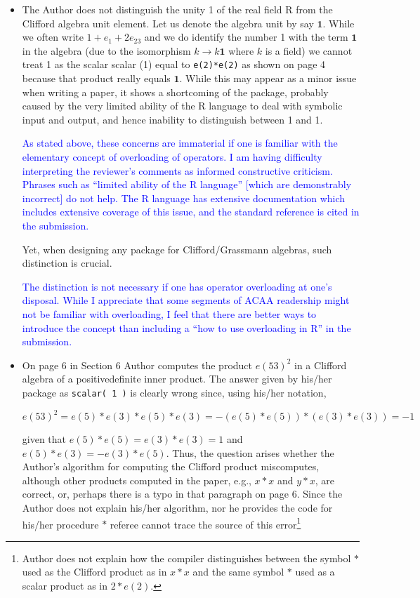\documentclass{article}
\begin{document}
\begin{itemize}
\item The Author does not distinguish the unity 1 of the real field R
  from the Clifford algebra unit element. Let us denote the algebra
  unit by say $\mathbf{1}$. While we often write $1 + e_1 + 2e_{23}$
  and we do identify the number 1 with the term $\mathbf{1}$ in the
  algebra (due to the isomorphism $k\longrightarrow k\mathbf{1}$ where
  $k$ is a field) we cannot treat 1 as the scalar scalar (1) equal to
  \verb+e(2)*e(2)+ as shown on page 4 because that product really
  equals $\mathbf{1}$.  While this may appear as a minor issue when
  writing a paper, it shows a shortcoming of the package, probably
  caused by the very limited ability of the R language to deal with
  symbolic input and output, and hence inability to distinguish
  between 1 and 1.

  \textcolor{blue}{As stated above, these concerns are immaterial if
    one is familiar with the elementary concept of overloading of
    operators.  I am having difficulty interpreting the reviewer's
    comments as informed constructive criticism.  Phrases such as
    ``limited ability of the R language'' [which are demonstrably
      incorrect] do not help.  The R language has extensive
    documentation which includes extensive coverage of this issue, and
    the standard reference is cited in the submission.}

  Yet, when designing any package for Clifford/Grassmann algebras,
  such distinction is crucial.

  \textcolor{blue}{The distinction is not necessary if one has
    operator overloading at one's disposal.  While I appreciate that
    some segments of ACAA readership might not be familiar with
    overloading, I feel that there are better ways to introduce the
    concept than including a ``how to use overloading in R'' in the
    submission.}

\item On page 6 in Section 6 Author computes the product $e(53)^2$ in
  a Clifford algebra of a positivedefinite inner product. The answer
  given by his/her package as \verb+scalar( 1 )+ is clearly wrong
  since, using his/her notation,

  $$
  e(53)^2=e(5)*e(3)*e(5)*e(3)=-(e(5)*e(5))*(e(3)*e(3))=-1
  $$

given that $e(5)*e(5)=e(3)*e(3)=1$ and $e(5)*e(3)=-e(3)*e(5)$.  Thus,
the question arises whether the Author’s algorithm for computing the
Clifford product miscomputes, although other products computed in the
paper, e.g., $x * x$ and $y * x$, are correct, or, perhaps there is a
typo in that paragraph on page 6.  Since the Author does not explain
his/her algorithm, nor he provides the code for his/her procedure $*$
referee cannot trace the source of this error\footnote{Author does not
explain how the compiler distinguishes between the symbol $*$ used as
the Clifford product as in $x * x$ and the same symbol $*$ used as a
scalar product as in $2 * e(2)$.

}
\end{itemize}
\end{document}
